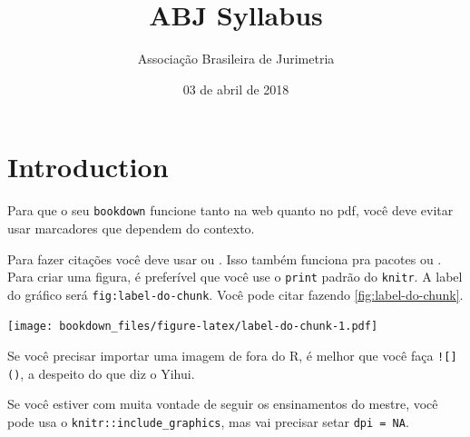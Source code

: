 \documentclass[]{report}
\title{ABJ Syllabus}
\author{Associação Brasileira de Jurimetria}
\date{03 de abril de 2018}
\let\origfigure\figure
\let\endorigfigure\endfigure
\renewenvironment{figure}[1][2] {
    \expandafter\origfigure\expandafter[H]
} {
    \endorigfigure
}
\theoremstyle{definition}
\theoremstyle{definition}
\theoremstyle{definition}
\theoremstyle{remark}
\begin{document}
\maketitle

{
\hypersetup{linkcolor=black}
\setcounter{tocdepth}{2}
\tableofcontents
}
\listoftables
\listoffigures
\chapter{Introduction}\label{introducao-2}

Para que o seu \texttt{bookdown} funcione tanto na web quanto no pdf,
você deve evitar usar marcadores que dependem do contexto.

Para fazer citações você deve usar \citep{Weinstein1997} ou
\citet{Weinstein1997}. Isso também funciona pra pacotes \citep{R-base}
ou \citet{R-base}. Para criar uma figura, é preferível que você use o
\texttt{print} padrão do \texttt{knitr}. A label do gráfico será
\texttt{fig:label-do-chunk}. Você pode citar fazendo
\ref{fig:label-do-chunk}.

\begin{figure}
\centering
\texttt{[image: bookdown\_files/figure-latex/label-do-chunk-1.pdf]}
\caption{\label{fig:label-do-chunk}Este é um gráfico.}
\end{figure}

Se você precisar importar uma imagem de fora do R, é melhor que você
faça \texttt{!{[}{]}()}, a despeito do que diz o Yihui.

Se você estiver com muita vontade de seguir os ensinamentos do mestre,
você pode usa o \texttt{knitr::include\_graphics}, mas vai precisar
setar \texttt{dpi\ =\ NA}.
\end{document}
